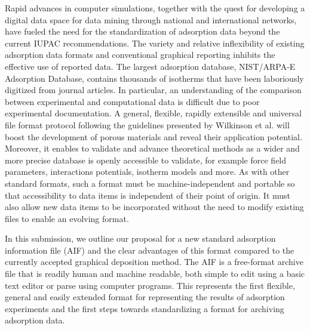 \documentclass[journal=langd5,manuscript=article]{achemso}
\begin{document}
Rapid advances in computer simulations, together with the quest for developing a digital data space for data mining through national and international networks, have fueled the need for the standardization of adsorption data beyond the current IUPAC recommendations.
The variety and relative inflexibility of existing adsorption data formats and conventional graphical reporting inhibits the effective use of reported data.
The largest adsorption database, NIST/ARPA-E Adsorption Database, contains thousands of isotherms that have been laboriously digitized from journal articles.\cite{NIST}
In particular, an understanding of the comparison between experimental and computational data is difficult due to poor experimental documentation.\cite{10.1021/acs.chemmater.7b04287}
A general, flexible, rapidly extensible and universal file format protocol following the guidelines presented by Wilkinson et al. will boost the development of porous materials and reveal their application potential.
Moreover, it enables to validate and advance theoretical methods as a wider and more precise database is openly accessible to validate, for example force field parameters, interactions potentials, isotherm models and more. 
As with other standard formats, such a format must be machine-independent and portable so that accessibility to data items is independent of their point of origin.
It must also allow new data items to be incorporated without the need to modify existing files to enable an evolving format.

In this submission, we outline our proposal for a new standard adsorption information file (AIF) and the clear advantages of this format compared to the currently accepted graphical deposition method.
The AIF is a free-format archive file that is readily human and machine readable, both simple to edit using a basic text editor or parse using computer programs.
This represents the first flexible, general and easily extended format for representing the results of adsorption experiments and the first steps towards standardizing a format for archiving adsorption data. 
\end{document}
